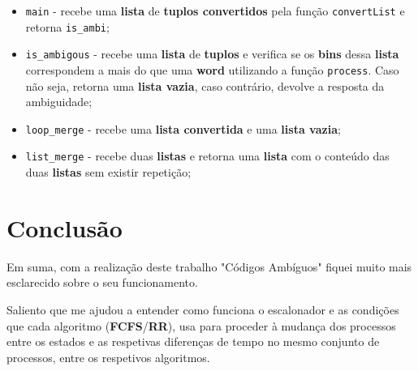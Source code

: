 \documentclass[11pt]{article}   %
\begin{document}
\begin{itemize}
    \item \verb|main| - recebe uma \textbf{lista} de \textbf{tuplos convertidos} pela função 
    \verb|convertList| e retorna \verb|is_ambi|;
    \item \verb|is_ambigous| - recebe uma \textbf{lista} de \textbf{tuplos} e verifica se os 
    \textbf{bins} dessa \textbf{lista} correspondem a mais do que uma \textbf{word} utilizando 
    a função \verb|process|. Caso não seja, retorna uma \textbf{lista vazia}, caso contrário, 
    devolve a resposta da ambiguidade;
    \item \verb|loop_merge| - recebe uma \textbf{lista convertida} e uma \textbf{lista vazia};
    \item \verb|list_merge| - recebe duas \textbf{listas} e retorna uma \textbf{lista} com o 
    conteúdo das duas \textbf{listas} sem existir repetição;
\end{itemize}

\section{Conclusão} %
\hspace{0,5cm}Em suma, com a realização deste trabalho "Códigos Ambíguos" fiquei muito mais esclarecido sobre o seu funcionamento. \par
Saliento que me ajudou a entender como funciona o escalonador e as condições que cada algoritmo (\textbf{FCFS}/\textbf{RR}), usa para proceder à mudança dos processos entre os estados e as respetivas diferenças de tempo no mesmo conjunto de processos, entre os respetivos algoritmos.
\end{document}
